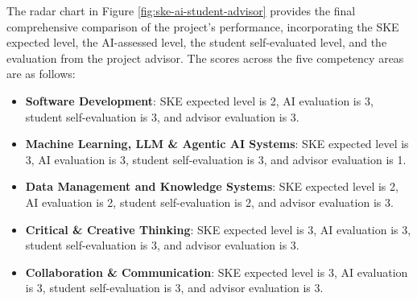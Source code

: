 The radar chart in Figure \ref{fig:ske-ai-student-advisor} provides the final comprehensive comparison of the project's performance, incorporating the SKE expected level,
the AI-assessed level, the student self-evaluated level, and the evaluation from the project advisor. The scores across the five competency areas are as follows:
\begin{itemize}[itemsep=0.2em, topsep=0.2em, parsep=0pt, partopsep=0pt]
    \item \textbf{Software Development}: SKE expected level is 2, AI evaluation is 3, student self-evaluation is 3, and advisor evaluation is 3.
    \item \textbf{Machine Learning, LLM \& Agentic AI Systems}: SKE expected level is 3, AI evaluation is 3, student self-evaluation is 3, and advisor evaluation is 1.
    \item \textbf{Data Management and Knowledge Systems}: SKE expected level is 2, AI evaluation is 2, student self-evaluation is 2, and advisor evaluation is 3.
    \item \textbf{Critical \& Creative Thinking}: SKE expected level is 3, AI evaluation is 3, student self-evaluation is 3, and advisor evaluation is 3.
    \item \textbf{Collaboration \& Communication}: SKE expected level is 3, AI evaluation is 3, student self-evaluation is 3, and advisor evaluation is 3.
\end{itemize}

